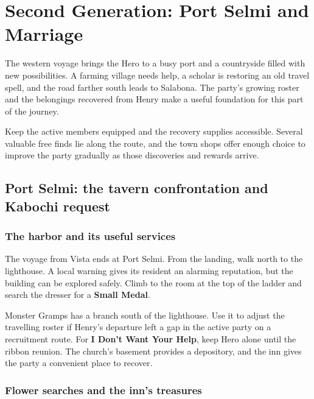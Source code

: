 \chapter{Second Generation: Port Selmi and Marriage}
\label{written-marriage}


The western voyage brings the Hero to a busy port and a countryside
filled with new possibilities. A farming village needs help, a scholar
is restoring an old travel spell, and the road farther south leads to
Salabona. The party's growing roster and the belongings recovered from
Henry make a useful foundation for this part of the journey.

Keep the active members equipped and the recovery supplies accessible.
Several valuable free finds lie along the route, and the town shops
offer enough choice to improve the party gradually as those discoveries
and rewards arrive.

\section{Port Selmi: the tavern confrontation and Kabochi request}

\subsection*{The harbor and its useful services}

The voyage from Vista ends at Port Selmi. From the landing, walk north
to the lighthouse. A local warning gives its resident an alarming
reputation, but the building can be explored safely. Climb to the
room at the top of the ladder and search the dresser for a
\textbf{Small Medal}.

Monster Gramps has a branch south of the lighthouse. Use it to adjust
the travelling roster if Henry's departure left a gap in the active
party on a recruitment route. For \textbf{I Don't Want Your Help},
keep Hero alone until the ribbon reunion. The church's basement provides a depository, and the inn gives
the party a convenient place to recover.

\subsection*{Flower searches and the inn's treasures}

